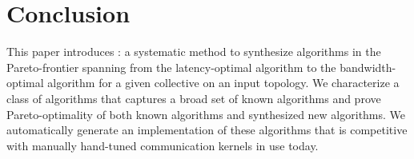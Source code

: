 \section{Conclusion}
This paper introduces \tool: a systematic method to synthesize
algorithms in the Pareto-frontier spanning from the latency-optimal
algorithm to the bandwidth-optimal algorithm for a given collective on
an input topology. We characterize a class of algorithms that captures
a broad set of known algorithms and prove Pareto-optimality of both
known algorithms and synthesized new algorithms. We automatically
generate an implementation of these algorithms that is competitive
with manually hand-tuned communication kernels in use today. 
